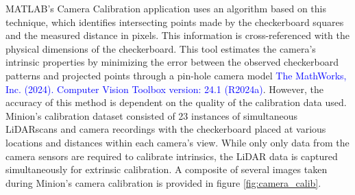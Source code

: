 \documentclass{erauthesis}
\begin{document}
MATLAB's Camera Calibration application uses an algorithm based on this technique, which identifies intersecting points made by the checkerboard squares and the measured distance in pixels. 
This information is cross-referenced with the physical dimensions of the checkerboard.
This tool estimates the camera's intrinsic properties by minimizing the error between the observed checkerboard patterns and projected points through a pin-hole camera model \textcolor{blue}{The MathWorks, Inc. (2024). Computer Vision Toolbox version: 24.1 (R2024a)}.
However, the accuracy of this method is dependent on the quality of the calibration data used. 
Minion's calibration dataset consisted of 23 instances of simultaneous LiDARscans and camera recordings with the checkerboard placed at various locations and distances within each camera's view. 
While only only data from the camera sensors are required to calibrate intrinsics, the LiDAR data is captured simultaneously for extrinsic calibration.
A composite of several images taken during Minion's camera calibration is provided in figure \ref{fig:camera_calib}.
\end{document}
